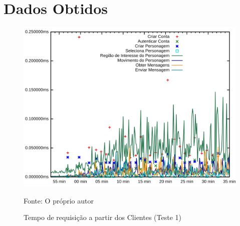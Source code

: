  
\chapter{Dados Obtidos}
\label{cap6}

\begin{figure}[htb!]
    \caption{Tempo de requisição a partir dos Clientes (Teste 1)}
    \label{fig:mrt1_rt}
    \includegraphics[width=\textwidth]{metricas_rudy_t1/request_time.png}
    \centering
    
    Fonte: O próprio autor
\end{figure}